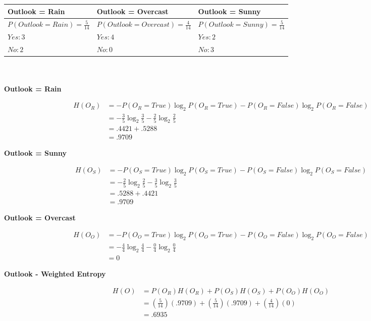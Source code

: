 \documentclass[11pt]{article}
\begin{document}
\begin{enumerate}
\begin{tabular}{l|l|l}
    \textbf{Outlook = Rain} & \textbf{Outlook = Overcast} & \textbf{Outlook = Sunny} \\
    \hline
    $P(Outlook = Rain) = \frac{5}{14}$ & $P(Outlook = Overcast) = \frac{4}{14}$ & $P(Outlook = Sunny) = \frac{5}{14}$ \\
    $Yes: 3$ & $Yes: 4$ & $Yes: 2$ \\
    $No: 2$ & $No: 0$ & $No: 3$ \\
\end{tabular}\\\\

\textbf{Outlook = Rain}

\[
\begin{aligned}
H(O_R)&= -P(O_R=True) \log_2 P(O_R=True)-P(O_R=False) \log_2 P(O_R=False)\\[5pt]
&= -\frac{3}{5}\log_2\frac{3}{5}-\frac{2}{5}\log_2\frac{2}{5}\\[5pt]
&= .4421 + .5288\\[5pt]
&= .9709
\end{aligned}
\]

\textbf{Outlook = Sunny}

\[
\begin{aligned}
H(O_S)&= -P(O_S=True) \log_2 P(O_S=True)-P(O_S=False) \log_2 P(O_S=False)\\[5pt]
&= -\frac{2}{5}\log_2\frac{2}{5}-\frac{3}{5}\log_2\frac{3}{5}\\[5pt]
&= .5288 + .4421\\[5pt]
&= .9709
\end{aligned}
\]

\textbf{Outlook = Overcast}

\[
\begin{aligned}
H(O_O)&= -P(O_O=True) \log_2 P(O_O=True)-P(O_O=False) \log_2 P(O_O=False)\\[5pt]
&= -\frac{4}{4}\log_2\frac{4}{4}-\frac{0}{4}\log_2\frac{0}{4}\\[5pt]
&= 0
\end{aligned}
\]

\textbf{Outlook - Weighted Entropy}

\[
\begin{aligned}
H(O)&= P(O_R)H(O_R)+P(O_S)H(O_S)+P(O_O)H(O_O)\\[5pt]
&= (\frac{5}{14})(.9709)+(\frac{5}{14})(.9709)+(\frac{4}{14})(0)\\[5pt]
&= .6935
\end{aligned}
\]


\end{enumerate}
\end{document}
